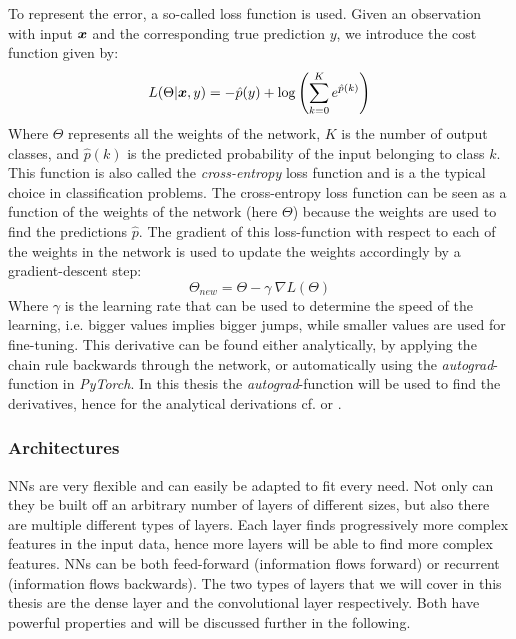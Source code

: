 To represent the error, a so-called loss function is used. Given an observation with input $\boldsymbol{x}$ and the corresponding true prediction $y$, we introduce the cost function given by:
\begin{equation}
    L(\Theta | \boldsymbol{x},y) = - \hat{p}(y) + \log\left(\sum_{k=0}^K e^{\hat{p}(k)}\right)
\end{equation}
Where $\Theta$ represents all the weights of the network, $K$ is the number of output classes, and $\hat{p}(k)$ is the predicted probability of the input belonging to class $k$. This function is also called the \textit{cross-entropy} loss function and is a the typical choice in classification problems. The cross-entropy loss function can be seen as a function of the weights of the network (here $\Theta$) because the weights are used to find the predictions $\hat{p}$. The gradient of this loss-function with respect to each of the weights in the network is used to update the weights accordingly by a gradient-descent step:
\begin{equation}
    \Theta_{new} = \Theta - \gamma \ \nabla L (\Theta)
\end{equation}
Where $\gamma$ is the learning rate that can be used to determine the speed of the learning, i.e. bigger values implies bigger jumps, while smaller values are used for fine-tuning. This derivative can be found either analytically, by applying the chain rule backwards through the network, or automatically using the \textit{autograd}-function in \textit{PyTorch}. In this thesis the \textit{autograd}-function will be used to find the derivatives, hence for the analytical derivations cf. \cite{elements_NN} or \cite{Zhang2016}.

\subsubsection{Architectures}
NNs are very flexible and can easily be adapted to fit every need. Not only can they be built off an arbitrary number of layers of different sizes, but also there are multiple different types of layers. Each layer finds progressively more complex features in the input data, hence more layers will be able to find more complex features. NNs can be both feed-forward (information flows forward) or recurrent (information flows backwards). The two types of layers that we will cover in this thesis are the dense layer and the convolutional layer respectively. Both have powerful properties and will be discussed further in the following.

